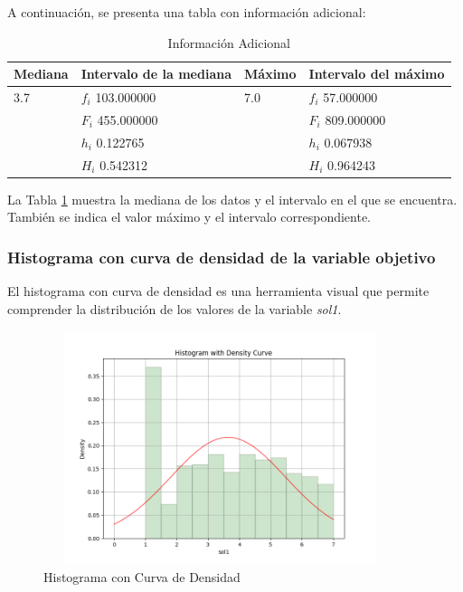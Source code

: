 A continuación, se presenta una tabla con información adicional:

\begin{table}[H]
    \centering
    \caption{Información Adicional}
    \begin{tabular}{llll}
        \hline
        \textbf{Mediana} & \textbf{Intervalo de la mediana} & \textbf{Máximo} & \textbf{Intervalo del máximo} \\
        \hline
        3.7              & $f_i$ 103.000000                 & 7.0             & $f_i$ 57.000000               \\
                         & $F_i$ 455.000000                 &                 & $F_i$ 809.000000              \\
                         & $h_i$ 0.122765                   &                 & $h_i$ 0.067938                \\
                         & $H_i$ 0.542312                   &                 & $H_i$ 0.964243                \\
        \hline
    \end{tabular}%
    \label{tab:informacion_adicional}%
\end{table}%

La Tabla \ref{tab:informacion_adicional} muestra la mediana de los datos y el intervalo en el que se encuentra. También se indica el valor máximo y el intervalo correspondiente.

\subsubsection{Histograma con curva de densidad de la variable objetivo}

El histograma con curva de densidad es una herramienta visual que permite comprender la distribución de los valores de la variable \textit{sol1}.

\begin{figure}[H]
    \centering
    \includegraphics[width=4.06111in,height=2.68611in]{img/histogramaConCurvaDeDensidad.png}
    \caption{Histograma con Curva de Densidad}
    \label{fig:hist_density}%
\end{figure}%

